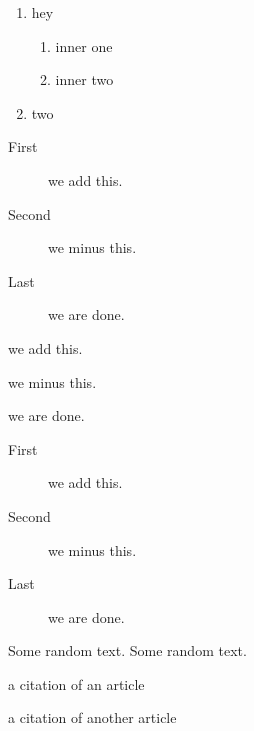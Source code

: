 \documentclass{article}
\begin{document}
\begin{enumerate}[Excerc{i}se 1]
\item hey
\begin{enumerate}[Excercise 1]
\item inner one
\item inner two
\end{enumerate}
\item two
\end{enumerate}

\begin{description}
\item[First] we add this.
\item[Second] we minus this.
\item[Last] we are done.
\end{description}
\begin{description}
\item we add this.
\item we minus this.
\item we are done.
\end{description}

\begin{description}
\item[\color{blue} First] we add this.
\item[\color{red} Second] we minus this.
\item[Last] we are done.
\end{description}


Some random text\cite{article1}. Some random text\cite{article2}.
\begin{thebibliography}{99}
a citation of an article

a citation of another article
\end{thebibliography}
\end{document}
